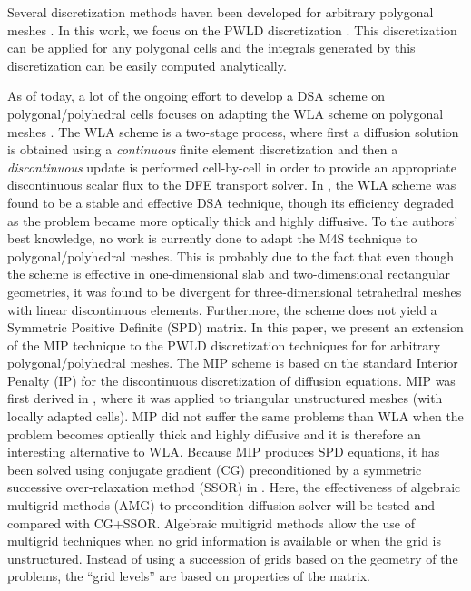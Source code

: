 Several discretization methods haven been developed for 
arbitrary polygonal meshes \cite{pwld_2d,pwld_3d,cfm_dfm,pwl_diffusion,
palmer_fe,mimetic,cell_centered_diff,palmer_proc,palmer_ane,wachspress,pwbld}.
In this work, we focus on the PWLD discretization \cite{pwld_2d,pwld_3d}. This
discretization can be applied for any polygonal cells and the integrals
generated by this discretization can be easily computed analytically. 

As of today, a lot of the ongoing effort to develop a DSA scheme on
polygonal/polyhedral cells focuses on adapting the WLA scheme on polygonal meshes
\cite{cfm_dfm,wla_pwl}. The WLA scheme is a two-stage process, where first a
diffusion solution is obtained using a {\em continuous} finite element
discretization and then a {\em discontinuous } update is performed cell-by-cell 
in order to provide an appropriate discontinuous scalar flux to the DFE transport 
solver. In \cite{consistent_p1}, the WLA scheme was
found to be a stable and effective DSA technique, though its efficiency
degraded as the problem became more optically thick and highly diffusive.
To the authors' best knowledge, no work is currently done to adapt the M4S 
technique to polygonal/polyhedral meshes. This is probably due to the fact
that even though the scheme is effective in one-dimensional slab and
two-dimensional rectangular geometries, it was found to be divergent for
three-dimensional tetrahedral meshes with linear discontinuous elements.
Furthermore, the scheme does not yield a Symmetric Positive Definite (SPD)
matrix. In this paper, we present an extension of the MIP technique to the
PWLD discretization techniques for for arbitrary polygonal/polyhedral meshes.
The MIP scheme is based on the standard Interior Penalty (IP) for the
discontinuous discretization of diffusion equations. MIP was first derived in
\cite{mip}, where it was applied to triangular unstructured meshes (with
locally adapted cells). MIP did not suffer the same problems than WLA when the
problem becomes optically thick and highly diffusive and it is therefore an
interesting alternative to WLA. Because MIP produces SPD
equations, it has been solved using conjugate gradient (CG) preconditioned by
a symmetric successive over-relaxation method (SSOR) in \cite{mip}. Here, the
effectiveness of algebraic multigrid methods (AMG) to precondition diffusion
solver \cite{amg,amg_course} will be tested and compared with CG+SSOR.
Algebraic multigrid methods allow the use of multigrid techniques when no grid
information is available or when the grid is unstructured. Instead of using a
succession of grids based on the geometry of the problems, the ``grid levels''
are based on properties of the matrix.


